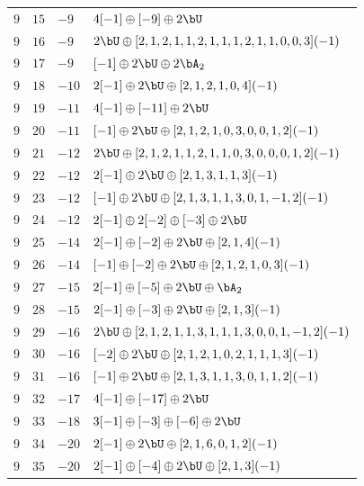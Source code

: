 \begin{center}
\begin{longtable}{llll}
 \(9\) & \(15\) & \(-9\) & \(4 [-1] \oplus [-9] \oplus 2 \bU\) \\
 \(9\) & \(16\) & \(-9\) & \(2 \bU \oplus [2, 1, 2, 1, 1, 2, 1, 1, 1, 2, 1, 1, 0, 0, 3](-1)\) \\
 \(9\) & \(17\) & \(-9\) & \([-1] \oplus 2 \bU \oplus 2 \bA_{2}\) \\
 \(9\) & \(18\) & \(-10\) & \(2 [-1] \oplus 2 \bU \oplus [2, 1, 2, 1, 0, 4](-1)\) \\
 \(9\) & \(19\) & \(-11\) & \(4 [-1] \oplus [-11] \oplus 2 \bU\) \\
 \(9\) & \(20\) & \(-11\) & \([-1] \oplus 2 \bU \oplus [2, 1, 2, 1, 0, 3, 0, 0, 1, 2](-1)\) \\
 \(9\) & \(21\) & \(-12\) & \(2 \bU \oplus [2, 1, 2, 1, 1, 2, 1, 1, 0, 3, 0, 0, 0, 1, 2](-1)\) \\
 \(9\) & \(22\) & \(-12\) & \(2 [-1] \oplus 2 \bU \oplus [2, 1, 3, 1, 1, 3](-1)\) \\
 \(9\) & \(23\) & \(-12\) & \([-1] \oplus 2 \bU \oplus [2, 1, 3, 1, 1, 3, 0, 1, -1, 2](-1)\) \\
 \(9\) & \(24\) & \(-12\) & \(2 [-1] \oplus 2 [-2] \oplus [-3] \oplus 2 \bU\) \\
 \(9\) & \(25\) & \(-14\) & \(2 [-1] \oplus [-2] \oplus 2 \bU \oplus [2, 1, 4](-1)\) \\
 \(9\) & \(26\) & \(-14\) & \([-1] \oplus [-2] \oplus 2 \bU \oplus [2, 1, 2, 1, 0, 3](-1)\) \\
 \(9\) & \(27\) & \(-15\) & \(2 [-1] \oplus [-5] \oplus 2 \bU \oplus \bA_{2}\) \\
 \(9\) & \(28\) & \(-15\) & \(2 [-1] \oplus [-3] \oplus 2 \bU \oplus [2, 1, 3](-1)\) \\
 \(9\) & \(29\) & \(-16\) & \(2 \bU \oplus [2, 1, 2, 1, 1, 3, 1, 1, 1, 3, 0, 0, 1, -1, 2](-1)\) \\
 \(9\) & \(30\) & \(-16\) & \([-2] \oplus 2 \bU \oplus [2, 1, 2, 1, 0, 2, 1, 1, 1, 3](-1)\) \\
 \(9\) & \(31\) & \(-16\) & \([-1] \oplus 2 \bU \oplus [2, 1, 3, 1, 1, 3, 0, 1, 1, 2](-1)\) \\
 \(9\) & \(32\) & \(-17\) & \(4 [-1] \oplus [-17] \oplus 2 \bU\) \\
 \(9\) & \(33\) & \(-18\) & \(3 [-1] \oplus [-3] \oplus [-6] \oplus 2 \bU\) \\
 \(9\) & \(34\) & \(-20\) & \(2 [-1] \oplus 2 \bU \oplus [2, 1, 6, 0, 1, 2](-1)\) \\
 \(9\) & \(35\) & \(-20\) & \(2 [-1] \oplus [-4] \oplus 2 \bU \oplus [2, 1, 3](-1)\) \\

\end{longtable}
\end{center}
